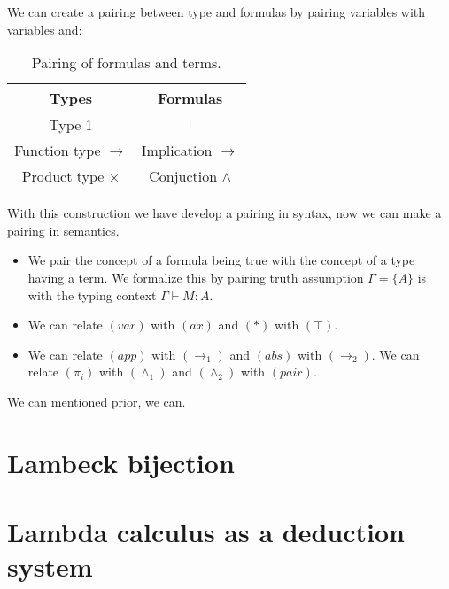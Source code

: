 We can create a pairing between type and formulas by pairing variables with variables and:
\begin{table}[!h]
\begin{center}
\begin{tabular}{c|c}
  Types  & Formulas  \\
  \hline
  Type 1 & $\top$ \\
  Function type $\to$   & Implication $\to$  \\
  Product type $\times$ & Conjuction $\land$ \\  
\end{tabular}
\caption*{\label{tab:table-name} Pairing of formulas and terms.}
\end{center}
\end{table}


With this construction we have develop a pairing in syntax,  now we can make a pairing in semantics.
\begin{itemize}
\item We pair the concept of a formula being true with the concept of a type having a term. We formalize this by pairing truth assumption $\Gamma=\{A\}$ is with the typing context $\Gamma\vdash M:A$. 
\item We can relate $(var)$ with $(ax)$ and $(*)$ with $(\top)$.
\item We can relate $(app)$ with $(\to_1)$ and $(abs)$ with $(\to_2)$.
  We can relate $(\pi_i)$ with $(\land_1)$ and $(\land_2)$ with $(pair)$.
\end{itemize}


We can mentioned prior, we can.
\section{Lambeck bijection}

\section{Lambda calculus as a deduction system}